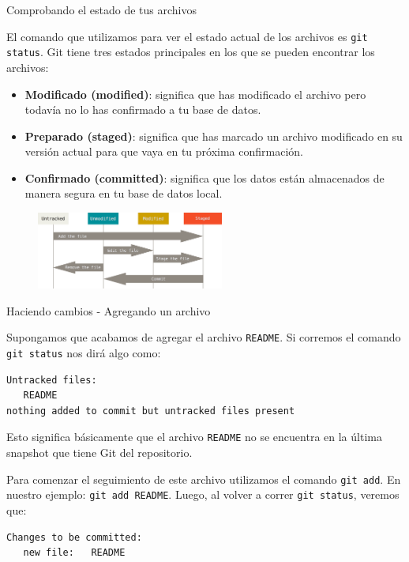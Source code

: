\documentclass{beamer}
\begin{document}
\begin{frame}{Comprobando el estado de tus archivos}

    El comando que utilizamos para ver el estado actual de los archivos es \texttt{git status}.
    Git tiene tres estados principales en los que se pueden encontrar los archivos:

    \begin{itemize}
        \item \textbf{Modificado (modified)}: significa que has modificado el archivo pero todavía no lo has confirmado a tu base de datos.
        \item \textbf{Preparado (staged)}: significa que has marcado un archivo modificado en su versión actual para que vaya en tu próxima confirmación.
        \item \textbf{Confirmado (committed)}: significa que los datos están almacenados de manera segura en tu base de datos local.
    \end{itemize}

    \begin{figure}[ht]
        \begin{center}
            \includegraphics[height=1in]{files-lifecycle.png}
        \end{center}
    \end{figure}

\end{frame}

\begin{frame}[fragile]{Haciendo cambios - Agregando un archivo}

    Supongamos que acabamos de agregar el archivo \texttt{README}.
    Si corremos el comando \texttt{git status} nos dirá algo como:
    \begin{verbatim}
Untracked files:
   README
nothing added to commit but untracked files present
    \end{verbatim}
    Esto significa básicamente que el archivo \texttt{README} no se encuentra
    en la última snapshot que tiene Git del repositorio.

    Para comenzar el seguimiento de este archivo utilizamos el comando \texttt{git add}. En nuestro ejemplo: \texttt{git add README}.
    Luego, al volver a correr \texttt{git status}, veremos que:
    \begin{verbatim}
Changes to be committed:
   new file:   README
    \end{verbatim}

\end{frame}
\end{document}
